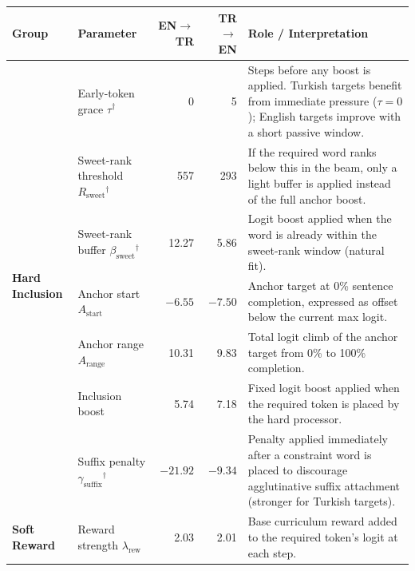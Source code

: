 \documentclass{CUP-JNL-NLP}
\begin{document}
\begin{table}[htbp]
  {\tablefont\begin{minipage}{\textwidth}
    \setlength{\tabcolsep}{3.5pt}
    \begin{tabular}{llrrp{4.2cm}}
      \toprule
      Group & Parameter & EN$\rightarrow$TR & TR$\rightarrow$EN &
        Role / Interpretation \\
      \midrule
      \multirow{7}{*}{\textbf{Hard Inclusion}}
        & Early-token grace $\tau$$^\dagger$ & 0 & 5
          & Steps before any boost is applied. Turkish targets benefit from
            immediate pressure ($\tau{=}0$); English targets improve with a
            short passive window. \\
        & Sweet-rank threshold $R_{\text{sweet}}$$^\dagger$ & 557 & 293
          & If the required word ranks below this in the beam, only a light
            buffer is applied instead of the full anchor boost. \\
        & Sweet-rank buffer $\beta_{\text{sweet}}$$^\dagger$ & 12.27 & 5.86
          & Logit boost applied when the word is already within the sweet-rank
            window (natural fit). \\
        & Anchor start $A_{\text{start}}$ & $-6.55$ & $-7.50$
          & Anchor target at 0\% sentence completion, expressed as offset
            below the current max logit. \\
        & Anchor range $A_{\text{range}}$ & 10.31 & 9.83
          & Total logit climb of the anchor target from 0\% to 100\%
            completion. \\
        & Inclusion boost & 5.74 & 7.18
          & Fixed logit boost applied when the required token is placed by
            the hard processor. \\
        & Suffix penalty $\gamma_{\text{suffix}}$$^\dagger$ & $-21.92$ & $-9.34$
          & Penalty applied immediately after a constraint word is placed to
            discourage agglutinative suffix attachment (stronger for Turkish
            targets). \\
      \midrule
      \multirow{4}{*}{\textbf{Soft Reward}}
        & Reward strength $\lambda_{\text{rew}}$ & 2.03 & 2.01
          & Base curriculum reward added to the required token's logit at each step. \\

\end{tabular}
\end{minipage}}
\end{table}
\end{document}
